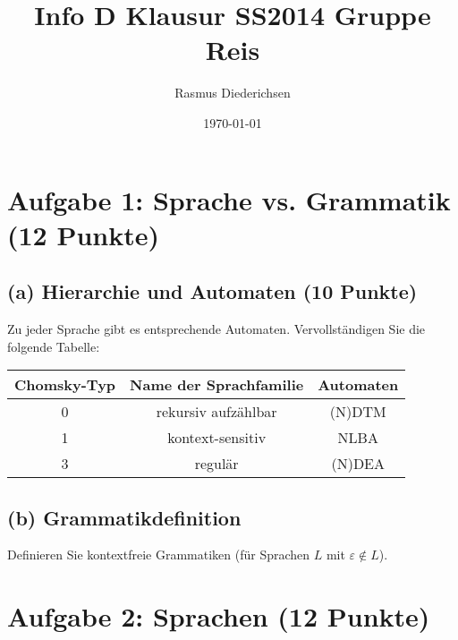 \documentclass{scrartcl}
\title{Info D Klausur SS2014 Gruppe Reis}
\author{Rasmus Diederichsen}
\date{\today}
\begin{document}
\section*{Aufgabe 1: Sprache vs. Grammatik \hfill (12 Punkte)} 

\subsection*{(a) Hierarchie und Automaten \hfill \normalfont (10 Punkte)}
Zu jeder Sprache gibt es entsprechende Automaten. Vervollständigen Sie die 
folgende Tabelle:

\begin{center}
{\renewcommand{\arraystretch}{2}
\begin{tabular}{|c|c|c|}
\hline
Chomsky-Typ & Name der Sprachfamilie & Automaten \\
\hline\hline\hline
0 & \cellcolor{lightgray!20}rekursiv aufzählbar & \cellcolor{lightgray!20}(N)DTM \\
\hline
\cellcolor{lightgray!20}1 & \cellcolor{lightgray!20}kontext-sensitiv & NLBA \\
\hline
\cellcolor{lightgray!20}3 & regulär & \cellcolor{lightgray!20}(N)DEA \\
\hline
\end{tabular}}
\end{center}


\subsection*{(b) Grammatikdefinition \hfill{} } 
Definieren Sie kontextfreie Grammatiken (für Sprachen $L$ mit
\vspace{\baselineskip}
$\varepsilon\not\in L$).

\begin{center}
   \noindent{}
\end{center}

\section*{Aufgabe 2: Sprachen \hfill{} (12 Punkte)}
\end{document}
